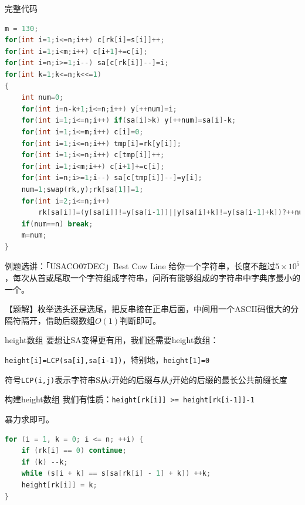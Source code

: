 \documentclass{beamer}
\begin{document}
\begin{frame}[fragile]{完整代码}
    \small
    \begin{lstlisting}[language=c++]
m = 130;
for(int i=1;i<=n;i++) c[rk[i]=s[i]]++;
for(int i=1;i<m;i++) c[i+1]+=c[i];
for(int i=n;i>=1;i--) sa[c[rk[i]]--]=i;
for(int k=1;k<=n;k<<=1)
{
    int num=0;
    for(int i=n-k+1;i<=n;i++) y[++num]=i;
    for(int i=1;i<=n;i++) if(sa[i]>k) y[++num]=sa[i]-k;
    for(int i=1;i<=m;i++) c[i]=0;
    for(int i=1;i<=n;i++) tmp[i]=rk[y[i]];
    for(int i=1;i<=n;i++) c[tmp[i]]++;
    for(int i=1;i<m;i++) c[i+1]+=c[i];
    for(int i=n;i>=1;i--) sa[c[tmp[i]]--]=y[i];
    num=1;swap(rk,y);rk[sa[1]]=1;
    for(int i=2;i<=n;i++)
        rk[sa[i]]=(y[sa[i]]!=y[sa[i-1]]||y[sa[i]+k]!=y[sa[i-1]+k])?++num:num;
    if(num==n) break;
    m=num;
}
    \end{lstlisting}
\end{frame}

\begin{frame}{例题选讲：「USACO07DEC」Best Cow Line}
给你一个字符串，长度不超过$5\times 10^5$，每次从首或尾取一个字符组成字符串，问所有能够组成的字符串中字典序最小的一个。

\vspace{1em}\pause
【题解】枚举选头还是选尾，把反串接在正串后面，中间用一个ASCII码很大的分隔符隔开，借助后缀数组$O(1)$判断即可。
\end{frame}

\begin{frame}[fragile]{height数组}
    要想让SA变得更有用，我们还需要height数组：

    \verb|height[i]=LCP(sa[i],sa[i-1])|，特别地，\verb|height[1]=0|

    \vspace{1em}
    符号\verb|LCP(i,j)|表示字符串S从$i$开始的后缀与从$j$开始的后缀的最长公共前缀长度
\end{frame}

\begin{frame}[fragile]{构建height数组}
    我们有性质：\verb|height[rk[i]] >= height[rk[i-1]]-1|

    \pause \vspace{1em} 暴力求即可。
    \begin{lstlisting}[language=c++]
for (i = 1, k = 0; i <= n; ++i) {
    if (rk[i] == 0) continue;
    if (k) --k;
    while (s[i + k] == s[sa[rk[i] - 1] + k]) ++k;
    height[rk[i]] = k;
}
    \end{lstlisting}
\end{frame}
\end{document}
